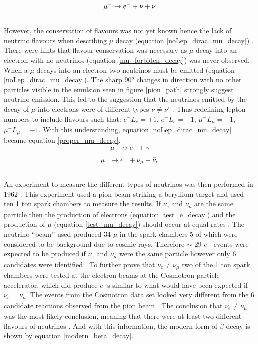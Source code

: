 \begin{equation}
    \mu^- \rightarrow e^- + \nu + \Bar{\nu}
    \label{noLep_dirac_mu_decay}
\end{equation}
\\However, the conservation of flavours was not yet known hence the lack of neutrino flavours when describing $\mu$ decay (equation \ref{noLep_dirac_mu_decay}) \cite{griffiths2008book} \cite{griffiths2008neutrino1.5}. There were hints that flavour conservation was necessary as $\mu$ decay into an electron with no neutrinos (equation \ref{mu_forbiden_decay}) was never observed. When a $\mu$ decays into an electron two neutrinos must be emitted (equation \ref{noLep_dirac_mu_decay}). The sharp 90$^o$ changes in direction with no other particles visible in the emulsion seen in figure \ref{pion_path} strongly suggest neutrino emission. This led to the suggestion that the neutrinos emitted by the decay of $\mu$ into electrons were of different types $\nu \not= \nu'$ \cite{Lee:1960tja} \cite{griffiths2008book} \cite{griffiths2008neutrino1.5}. Thus redefining lepton numbers to include flavours such that: $e^- L_e = +1$, $e^+ L_e = -1$, $\mu^- L_\mu = +1 $, $\mu^+ L_\mu = -1 $. With this understanding, equation \ref{noLep_dirac_mu_decay} became equation \ref{proper_mu_decay}.
\begin{equation}
    \mu^- \not\to e^- + \gamma
    \label{mu_forbiden_decay}
\end{equation}
\begin{equation}
    \mu^- \rightarrow e^- + \nu_\mu + \Bar{\nu}_e
    \label{proper_mu_decay}
\end{equation}
\\An experiment to measure the different types of neutrinos was then performed in 1962 \cite{DanbyG1962PhysRevLett.9.36}. This experiment used a pion beam striking a beryllium target and used ten 1 ton spark chambers to measure the results. If $\nu_e$ and $\nu_\mu$ are the same particle then the production of electrons (equation \ref{test_e_decay}) and the production of $\mu$ (equation \ref{test_mu_decay}) should occur at equal rates \cite{DanbyG1962PhysRevLett.9.36}. The neutrino ``beam'' used produced 34 $\mu$ in the spark chambers 5 of which were considered to be background due to cosmic rays. Therefore $\sim$ 29 $e^-$ events were expected to be produced if $\nu_e$ and $\nu_\mu$ were the same particle however only 6 candidates were identified \cite{DanbyG1962PhysRevLett.9.36}. To further prove that $\nu_e \not= \nu_\mu$ two of the 1 ton spark chambers were tested at the electron beams at the Cosmotron particle accelerator, which did produce $e^-$s similar to what would have been expected if $\nu_e = \nu_\mu$. The events from the Cosmotron data set looked very different from the 6 candidate reactions observed from the pion beam \cite{DanbyG1962PhysRevLett.9.36}. The conclusion that $\nu_e \not= \nu_\mu$ was the most likely conclusion, meaning that there were at least two different flavours of neutrinos \cite{DanbyG1962PhysRevLett.9.36}. And with this information, the modern form of $\beta$ decay is shown by equation \ref{modern_beta_decay}.
